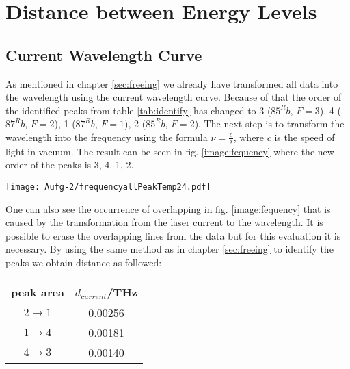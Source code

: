 \section{Distance between Energy Levels}
\label{sec:distance}
\subsection*{Current Wavelength Curve}
As mentioned in chapter \ref{sec:freeing} we already have transformed all data into the wavelength using the current wavelength curve. Because of that the order of the identified peaks from table \ref{tab:identify} has changed to 3 (${85}^Rb$, $F=3$), 4 (${87}^Rb$, $F=2$), 1 (${87}^Rb$, $F=1$), 2 (${85}^Rb$, $F=2$). The next step is to transform the wavelength into the frequency using the formula $\nu=\frac{c}{\lambda}$, where $c$ is the speed of light in vacuum. The result can be seen in fig. \ref{image:fequency} where the new order of the peaks is 3, 4, 1, 2.
\begin{center}
    \texttt{[image: Aufg-2/frequencyallPeakTemp24.pdf]}
    \label{image:fequency}
\end{center}
One can also see the occurrence of overlapping in fig. \ref{image:fequency} that is caused by the transformation from the laser current to the wavelength. It is possible to erase the overlapping lines from the data but for this evaluation it is necessary.
By using the same method as in chapter \ref{sec:freeing} to identify the peaks we obtain distance as followed:
\begin{center}
    \begin{tabular}{c | c}
        peak area & $d_{current}$/THz\\
        \hline
        $2 \rightarrow 1$ & 0.00256\\
        $1 \rightarrow 4$ & 0.00181\\
        $4 \rightarrow 3$ & 0.00140\\
    \end{tabular}
    \label{tab:currentMethode}
\end{center}
